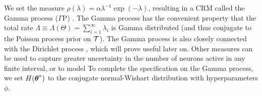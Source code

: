 We set the \Levy measure $\rho(\lambda) = \alpha \lambda^{-1}\exp(-\lambda)$,
resulting in a CRM called the Gamma process ($\Gamma$P) \citep{applebaum2004}. 
The Gamma process has the convenient property that the 
total rate $\Lambda \equiv \mathsf{\Lambda}(\Theta) = \sum_{i=1}^{\infty} \lambda_i$ is Gamma distributed (and thus conjugate to the Poisson process prior on $\mathcal{T}$).
The Gamma process is also closely connected with the Dirichlet process \citep{Ferguson73}, which will prove useful
later on.
Other \Levy measures can be used to capture greater uncertainty in the number of neurons active in any finite interval, or to model
To complete the specification on the Gamma process, %
we set $H(\boldsymbol{\theta}^*)$ 
to the conjugate normal-Wishart distribution with hyperparameters $\phi$.


